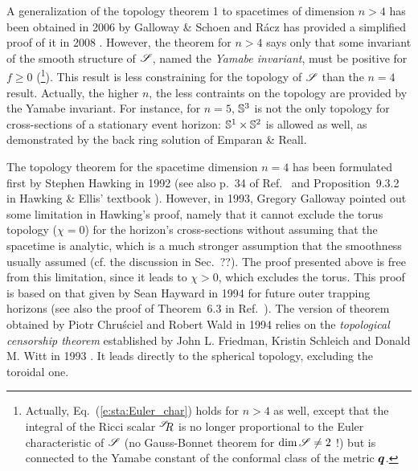 A generalization of the topology theorem 1 to spacetimes of
dimension $n>4$ has been obtained in 2006 by Galloway \& Schoen \cite{GalloS06}
and R\'acz has provided a simplified
proof of it in 2008 \cite{Racz08}.
However, the theorem for $n>4$ says only that some invariant
of the smooth structure of $\mathscr{S}$, named the
\emph{Yamabe invariant}, must be positive for
$f \geq 0$ (\footnote{Actually, Eq.~(\ref{e:sta:Euler_char}) holds for $n>4$
as well, except that the integral of the Ricci scalar ${}^{\mathscr{S}}\!\!R$ is no longer
proportional to the Euler characteristic of $\mathscr{S}$ (no Gauss-Bonnet theorem for $\mathrm{dim}\, \mathscr{S} \neq 2$ !) but is connected to the Yamabe constant of the conformal class of the metric $\bm{q}$.}). This result is less constraining for the topology of $\mathscr{S}$
than the $n=4$ result. Actually, the higher $n$, the less contraints on
the topology are provided by the Yamabe invariant. For instance,
for $n=5$, $\mathbb{S}^3$ is not the only topology for cross-sections
of a stationary event horizon: $\mathbb{S}^1\times\mathbb{S}^2$ is allowed as well, as demonstrated
by the back ring solution of Emparan \& Reall.


\begin{hist}
The topology theorem for the spacetime dimension $n=4$ has been formulated
first by Stephen Hawking in 1992 \cite{Hawki72}
(see also p.~34 of Ref.~\cite{Hawki73} and Proposition~9.3.2 in Hawking \& Ellis' textbook
\cite{HawkiE73}).
However, in 1993, Gregory Galloway \cite{Gallo94}
pointed out some limitation in Hawking's proof, namely that it cannot
exclude the torus topology ($\chi = 0$) for the horizon's cross-sections
without assuming that the spacetime is analytic, which is a much stronger
assumption that the smoothness usually assumed (cf. the discussion in Sec.~??).
The proof presented above is free from this limitation, since it leads to
$\chi > 0$, which excludes the torus. This proof is based on that given
by Sean Hayward in 1994 \cite{Haywa94}
for future outer trapping horizons (see also the proof of Theorem~6.3 in Ref.~\cite{Newma87}).
The version of theorem obtained by Piotr Chru\'sciel
and Robert Wald in 1994 \cite{ChrusW94b}
relies on the \emph{topological censorship theorem} established by
John L. Friedman, Kristin Schleich
and Donald M. Witt in 1993 \cite{FriedSW93}.
It leads directly to the spherical topology, excluding the toroidal one.
\end{hist}

